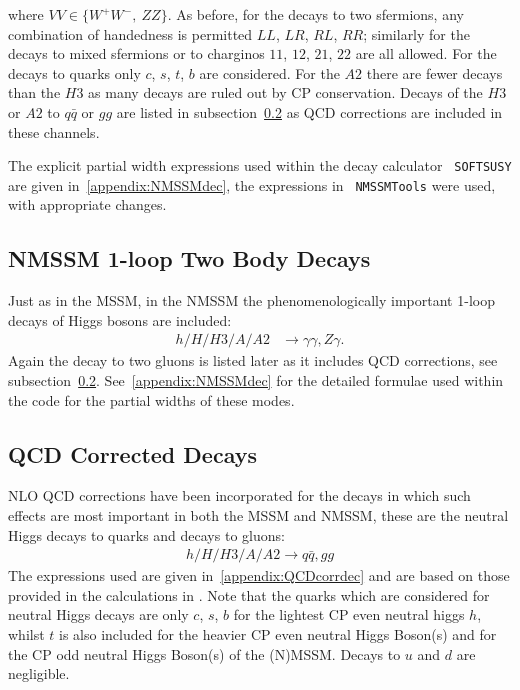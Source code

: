 \documentclass[final,3p,times,pdflatex]{elsarticle}
\begin{document}
where $VV \in \{W^+W^-,\ ZZ \}$.
As before, for the decays to two sfermions, any combination of handedness is
permitted $LL$, $LR$, $RL$, $RR$; similarly for the decays to mixed sfermions
or to charginos $11$, $12$, $21$, $22$ are all allowed. For the decays to
quarks only $c$, $s$, $t$, $b$ are considered. For the $A2$ there are fewer
decays than the $H3$ as many decays are ruled out by CP conservation. Decays 
of the $H3$ or $A2$ to $q \bar{q}$ or $gg$ are listed in subsection~\ref{ssec:QCD_Corrected_Decays}
as QCD corrections are included in these channels.

The explicit partial width expressions used within the decay calculator {\tt
  SOFTSUSY} are given in~\ref{appendix:NMSSMdec}, the expressions in {\tt
  NMSSMTools} \cite{Ellwanger:2004xm,Ellwanger:2012dd,Ellwanger:2006ch} were
used, with appropriate changes. 

\subsection{NMSSM 1-loop Two Body Decays}
Just as in the MSSM, in the NMSSM the phenomenologically important 1-loop decays of Higgs bosons are included:
\begin{align*}
h/H/H3/A/A2 &\rightarrow \gamma\gamma, Z\gamma.
\end{align*}
Again the decay to two gluons is listed later as it includes QCD corrections, see subsection~\ref{ssec:QCD_Corrected_Decays}.
See~\ref{appendix:NMSSMdec} for the detailed formulae used within the code for
the partial widths of these modes. 

\subsection{QCD Corrected Decays} \label{ssec:QCD_Corrected_Decays}
NLO QCD corrections have been incorporated for the decays in which such effects
are most important in both the MSSM and NMSSM, these are the neutral Higgs decays to quarks and decays to
gluons:
\begin{align*}
h/H/H3/A/A2 \rightarrow q \bar{q},  gg
\end{align*}
The expressions used are
given in~\ref{appendix:QCDcorrdec} and are based on those provided in the
calculations in \cite{Spira:2016,Djouadi:1996}. Note that the quarks which are considered for neutral Higgs
decays are only $c$, $s$, $b$ for the lightest CP even neutral higgs $h$, whilst $t$ is also included for the heavier CP
even neutral Higgs Boson(s) and for the CP odd neutral Higgs Boson(s) of the (N)MSSM\@. 
Decays to $u$ and $d$ are negligible.
\end{document}
